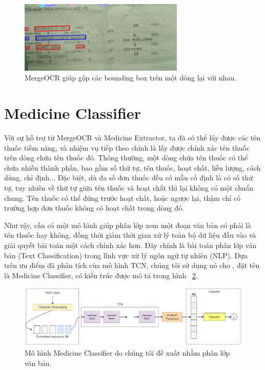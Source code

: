 \begin{figure}
\centering
\includegraphics[width=0.7\textwidth]{mep_img/merged_img.png}
\caption{MergeOCR giúp gộp các bounding box trên một dòng lại với nhau.}\label{merged_img}
\end{figure}

\section{Medicine Classifier}

Với sự hỗ trợ từ MergeOCR và Medicine Extractor, ta đã có thể lấy được các tên thuốc tiềm năng, và nhiệm vụ tiếp theo chính là lấy được chính xác tên thuốc trên dòng chứa tên thuốc đó. Thông thường, một dòng chứa tên thuốc có thể chứa nhiều thành phần, bao gồm số thứ tự, tên thuốc, hoạt chất, liều lượng, cách dùng, chỉ định... Đặc biệt, dù đa số đơn thuốc đều có mẫu cố định là có số thứ tự, tuy nhiên về thứ tự giữa tên thuốc và hoạt chất thì lại không có một chuẩn chung. Tên thuốc có thể đứng trước hoạt chất, hoặc ngược lại, thậm chí có trường hợp đơn thuốc không có hoạt chất trong dòng đó. 

Như vậy, cần có một mô hình giúp phân lớp xem một đoạn văn bản có phải là tên thuốc hay không, đồng thời giảm thời gian xử lý toàn bộ dữ liệu đầu vào và giải quyết bài toán một cách chính xác hơn. Đây chính là bài toán phân lớp văn bản (Text Classification) trong lĩnh vực xử lý ngôn ngữ tự nhiên (NLP). Dựa trên ưu điểm đã phân tích của mô hình TCN, chúng tôi sử dụng nó cho , đặt tên là Medicine Classifier, có kiến trúc được mô tả trong hình ~\ref{medicine_classifier_1}.

\begin{figure}
\centering
\includegraphics[width=1.0\textwidth]{mep_img/medicine_classifier_1.png}
\caption{Mô hình Medicine Classifier do chúng tôi đề xuất nhằm phân lớp văn bản.}\label{medicine_classifier_1}
\end{figure}

